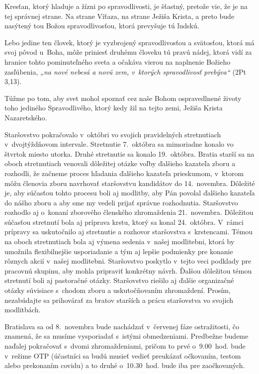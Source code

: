 Kresťan, ktorý hladuje a žízni po spravodlivosti, je šťastný, pretože vie, že je na tej správnej strane. Na strane Víťaza, na strane Ježiša Krista, a preto bude nasýtený tou Božou spravodlivosťou, ktorá prevyšuje tú ľudskú.

Lebo jedine ten človek, ktorý je vyzbrojený spravodlivosťou a svätosťou, ktorá má svoj pôvod u~Boha, môže priniesť druhému človeku tú pravú nádej, ktorá vidí za hranice tohto pominuteľného sveta a očakáva vierou na naplnenie Božieho zasľúbenia, {\it „na nové nebesá a novú zem, v~ktorých spravodlivosť prebýva“} (2Pt 3,13).

Túžme po tom, aby svet mohol spoznať cez naše Bohom ospravedlnené životy toho jediného Spravodlivého, ktorý kedy žil na tejto zemi, Ježiša Krista Nazaretského.




Staršovstvo pokračovalo v~októbri vo svojich pravidelných stretnutiach v~dvojtýždňovom intervale. Stretnutie 7.~októbra sa mimoriadne konalo vo štvrtok miesto utorka. Druhé stretnutie sa konalo 19.~októbra. Bratia starší sa na oboch stretnutiach venovali dôležitej otázke voľby ďalšieho kazateľa zboru a rozhodli, že začneme proces hľadania ďalšieho kazateľa prieskumom, v~ktorom môžu členovia zboru navrhovať staršovstvu kandidátov do 14.~novembra. Dôležité je, aby súčasťou tohto procesu boli aj modlitby, aby Pán povolal ďalšieho kazateľa do nášho zboru a aby sme my vedeli prijať správne rozhodnutia. Staršovstvo rozhodlo aj o~konaní zborového členského zhromaždenia 21.~novembra. Dôležitou súčasťou stretnutí bola aj príprava krstu, ktorý sa konal 24.~októbra. V~rámci prípravy sa uskutočnilo aj stretnutie a rozhovor staršovstva s~krstencami. Témou na oboch stretnutiach bola aj výmena sedenia v~našej modlitebni, ktorá by umožnila flexibilnejšie usporiadanie a tým aj lepšie podmienky pre konanie rôznych akcií v~našej modlitebni. Staršovstvo poskytlo v~tejto veci podklady pre pracovnú skupinu, aby mohla pripraviť konkrétny návrh. Ďalšou dôležitou témou stretnutí boli aj pastoračné otázky. Staršovstvo riešilo aj ďalšie organizačné otázky súvisiace s~chodom zboru a uskutočňovaním zhromaždení. Prosím, nezabúdajte sa prihovárať za bratov starších a prácu staršovstva vo svojich modlitbách.

\vfill\break


Bratislava sa od 8.~novembra bude nachádzať v~červenej fáze ostražitosti, čo znamená, že sa musíme vysporiadať s~istými obmedzeniami. Predbežne budeme naďalej pokračovať s~dvomi zhromaždeniami, pričom to prvé o~9.00~hod. bude v~režime OTP (účastníci sa budú musieť vedieť preukázať očkovaním, testom alebo prekonaním covidu) a to druhé o~10.30~hod. bude iba pre zaočkovaných.

